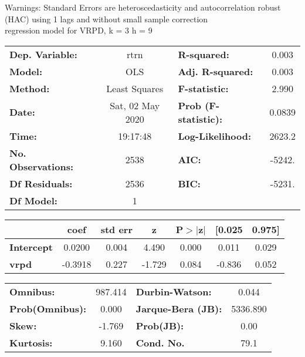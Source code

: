 Warnings: \newline
 [1] Standard Errors are heteroscedasticity and autocorrelation robust (HAC) using 1 lags and without small sample correction\\ 

regression model for VRPD, k = 3 h = 9\begin{center}
\begin{tabular}{lclc}
\toprule
\textbf{Dep. Variable:}    &       rtrn       & \textbf{  R-squared:         } &     0.003   \\
\textbf{Model:}            &       OLS        & \textbf{  Adj. R-squared:    } &     0.003   \\
\textbf{Method:}           &  Least Squares   & \textbf{  F-statistic:       } &     2.990   \\
\textbf{Date:}             & Sat, 02 May 2020 & \textbf{  Prob (F-statistic):} &   0.0839    \\
\textbf{Time:}             &     19:17:48     & \textbf{  Log-Likelihood:    } &    2623.2   \\
\textbf{No. Observations:} &        2538      & \textbf{  AIC:               } &    -5242.   \\
\textbf{Df Residuals:}     &        2536      & \textbf{  BIC:               } &    -5231.   \\
\textbf{Df Model:}         &           1      & \textbf{                     } &             \\
\bottomrule
\end{tabular}
\begin{tabular}{lcccccc}
                   & \textbf{coef} & \textbf{std err} & \textbf{z} & \textbf{P$> |$z$|$} & \textbf{[0.025} & \textbf{0.975]}  \\
\midrule
\textbf{Intercept} &       0.0200  &        0.004     &     4.490  &         0.000        &        0.011    &        0.029     \\
\textbf{vrpd}      &      -0.3918  &        0.227     &    -1.729  &         0.084        &       -0.836    &        0.052     \\
\bottomrule
\end{tabular}
\begin{tabular}{lclc}
\textbf{Omnibus:}       & 987.414 & \textbf{  Durbin-Watson:     } &    0.044  \\
\textbf{Prob(Omnibus):} &   0.000 & \textbf{  Jarque-Bera (JB):  } & 5336.890  \\
\textbf{Skew:}          &  -1.769 & \textbf{  Prob(JB):          } &     0.00  \\
\textbf{Kurtosis:}      &   9.160 & \textbf{  Cond. No.          } &     79.1  \\
\bottomrule
\end{tabular}
\end{center}

